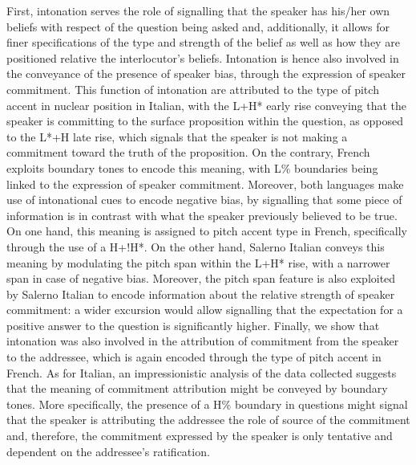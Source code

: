 \documentclass[output=paper,colorlinks,citecolor=brown]{langscibook}
\begin{document}
First, intonation serves the role of signalling that the speaker has his/her own beliefs with respect of the question being asked and, additionally, it allows for finer specifications of the type and strength of the belief as well as how they are positioned relative the interlocutor's beliefs. Intonation is hence also involved in the conveyance of the presence of speaker bias, through the expression of speaker commitment. This function of intonation are attributed to the type of pitch accent in nuclear position in Italian, with the L+H* early rise conveying that the speaker is committing to the surface proposition within the question, as opposed to the L*+H late rise, which signals that the speaker is not making a commitment toward the truth of the proposition. On the contrary, French exploits boundary tones to encode this meaning, with L\% boundaries being linked to the expression of speaker commitment. Moreover, both languages make use of intonational cues to encode negative bias, by signalling that some piece of information is in contrast with what the speaker previously believed to be true. On one hand, this meaning is assigned to pitch accent type in French, specifically through the use of a H+!H*. On the other hand, Salerno Italian conveys this meaning by modulating the pitch span within the L+H* rise, with a narrower span in case of negative bias. Moreover, the pitch span feature is also exploited by Salerno Italian to encode information about the relative strength of speaker commitment: a wider excursion would allow signalling that the expectation for a positive answer to the question is significantly higher. Finally, we show that intonation was also involved in the attribution of commitment from the speaker to the addressee, which is again encoded through the type of pitch accent in French. As for Italian, an impressionistic analysis of the data collected suggests that the meaning of commitment attribution might be conveyed by boundary tones. More specifically, the presence of a H\% boundary in questions might signal that the speaker is attributing the addressee the role of source of the commitment and, therefore, the commitment expressed by the speaker is only tentative and dependent on the addressee's ratification.
\end{document}
